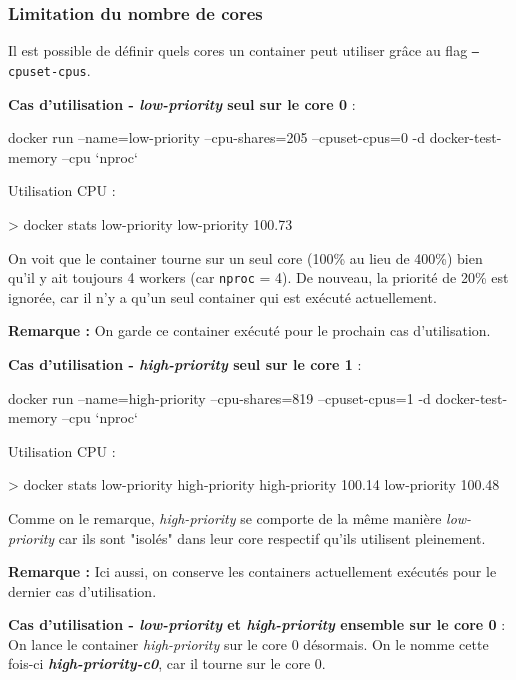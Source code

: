 \documentclass[11pt,a4paper,oneside]{report}
\newcommand{\code}[1]{\texttt{#1}}
\begin{document}
\subsubsection{Limitation du nombre de cores}
Il est possible de définir quels cores un container peut utiliser grâce au flag \code{--cpuset-cpus}.

\textbf{Cas d'utilisation - \textit{low-priority} seul sur le core 0} :

\begin{textcode}
docker run --name=low-priority --cpu-shares=205 --cpuset-cpus=0 -d docker-test-memory --cpu `nproc`
\end{textcode}

Utilisation CPU :
\begin{textcode}
> docker stats low-priority
low-priority   100.73%
\end{textcode}

On voit que le container tourne sur un seul core (100\% au lieu de 400\%) bien qu'il y ait toujours 4 workers (car \code{nproc} = 4). De nouveau, la priorité de 20\% est ignorée, car il n'y a qu'un seul container qui est exécuté actuellement.

\textbf{Remarque :} On garde ce container exécuté pour le prochain cas d'utilisation.

\textbf{Cas d'utilisation - \textit{high-priority} seul sur le core 1} :

\begin{textcode}
docker run --name=high-priority --cpu-shares=819 --cpuset-cpus=1 -d docker-test-memory --cpu `nproc`
\end{textcode}

Utilisation CPU :

\begin{textcode}
> docker stats low-priority high-priority 
high-priority   100.14%
low-priority    100.48%
\end{textcode}

Comme on le remarque, \textit{high-priority} se comporte de la même manière \textit{low-priority} car ils sont "isolés" dans leur core respectif qu'ils utilisent pleinement.

\textbf{Remarque :} Ici aussi, on conserve les containers actuellement exécutés pour le dernier cas d'utilisation.

\textbf{Cas d'utilisation - \textit{low-priority} et \textit{high-priority} ensemble sur le core 0} :
On lance le container \textit{high-priority} sur le core 0 désormais. On le nomme cette fois-ci \textbf{\textit{high-priority-c0}}, car il tourne sur le core 0.
\end{document}
